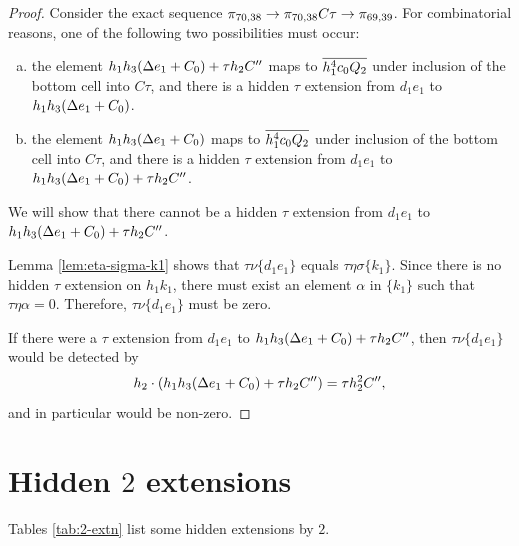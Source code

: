 \begin{proof}
Consider the exact sequence
$\pi_{70, 38} \rightarrow \pi_{70, 38} C\tau \rightarrow \pi_{69, 39}$.
For combinatorial reasons, one of the following two possibilities
must occur:
\begin{enumerate}[(a)]
\item
the element $h_1 h_3 (\Delta e_1 + C_0) + \tau h_2 C''$ maps to
$\overline{h_1^4 c_0 Q_2}$ 
under inclusion of the bottom cell into $C\tau$, and
there is a hidden $\tau$ extension from $d_1 e_1$ to 
$h_1 h_3 (\Delta e_1 + C_0)$.
\item
the element $h_1 h_3 (\Delta e_1 + C_0)$
maps to $\overline{h_1^4 c_0 Q_2}$ 
under inclusion of the bottom cell into $C\tau$, and
there is a hidden $\tau$ extension from $d_1 e_1$ to 
$h_1 h_3 (\Delta e_1 + C_0) + \tau h_2 C''$.
\end{enumerate}
We will show that there cannot be a hidden
$\tau$ extension from $d_1 e_1$ to
$h_1 h_3 (\Delta e_1 + C_0) + \tau h_2 C''$.

Lemma \ref{lem:eta-sigma-k1} shows that
$\tau \nu \{d_1 e_1\}$ equals
$\tau \eta \sigma \{k_1\}$.
Since there is no hidden $\tau$ extension on $h_1 k_1$,
there must exist an element $\alpha$ in $\{k_1\}$ such that
$\tau \eta \alpha = 0$.
Therefore,
$\tau \nu \{d_1 e_1\}$ must be zero.

If there were a $\tau$ extension from
$d_1 e_1$ to 
$h_1 h_3 (\Delta e_1 + C_0) + \tau h_2 C''$, then
$\tau \nu \{d_1 e_1\}$ would be detected by
\[
h_2 \cdot (h_1 h_3 (\Delta e_1 + C_0) + \tau h_2 C'') =
\tau h_2^2 C'',
\]
and in particular would be non-zero.
\end{proof}

\section{Hidden $2$ extensions}
\label{sctn:2-extn}

\begin{thm}
\label{thm:2-extn}
Tables \ref{tab:2-extn}  list some hidden extensions by $2$.
\end{thm}

